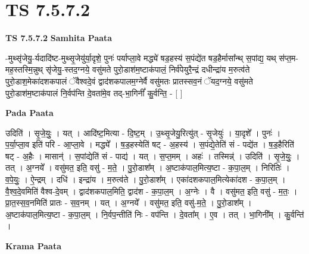 \documentclass[17pt]{extarticle}
\begin{document}
\section{ TS 7.5.7.2 }

\textbf{TS 7.5.7.2 } \newline
\textbf{Samhita Paata} \newline

-मुथ्सृ॑जेयु॒-र्यदादि॑ष्ट-मुथ्सृ॒जेयु॑र्या॒दृशे॒ पुनः॑ पर्याप्ला॒वे मद्ध्ये॑ षड॒हस्य॑ स॒पंद्ये॑त षड॒हैर्मासा᳚न्थ् स॒पांद्य॒ यथ् स॑प्त॒म- मह॒स्तस्मि॒न्नुथ् सृ॑जेयु॒-स्तद॒ग्नये॒ वसु॑मते पुरो॒डाश॑म॒ष्टाक॑पालं॒ निर्व॑पेयुरै॒न्द्रं दधीन्द्रा॑य म॒रुत्व॑ते पुरो॒डाश॒मेका॑दशकपालं ॅवैश्वदे॒वं द्वाद॑शकपालम॒ग्नेर्वै वसु॑मतः प्रातस्सव॒नं ॅयद॒ग्नये॒ वसु॑मते पुरो॒डाश॑म॒ष्टाक॑पालं नि॒र्वप॑न्ति दे॒वता॑मे॒व तद्-भा॒गिनीं᳚ कु॒र्वन्ति॒ - [  ] \newline

\textbf{Pada Paata} \newline

उदिति॑ । सृ॒जे॒युः॒ । यत् । आदि॑ष्ट॒मित्या - दि॒ष्ट॒म् । उ॒थ्सृ॒जेयु॒रित्यु॑त् - सृ॒जेयुः॑ । या॒दृशे᳚ । पुनः॑ । प॒र्या॒प्ला॒व इति॑ परि - आ॒प्ला॒वे । मद्ध्ये᳚ । ष॒ड॒हस्येति॑ षट् - अ॒हस्य॑ । स॒पंद्ये॒तेति॑ सं - पद्ये॑त । ष॒ड॒हैरिति॑ षट् - अ॒हैः । मासान्॑ । स॒पांद्येति॑ सं - पाद्य॑ । यत् । स॒प्त॒मम् । अहः॑ । तस्मिन्न्॑ । उदिति॑ । सृ॒जे॒युः॒ । तत् । अ॒ग्नये᳚ । वसु॑मत॒ इति॒ वसु॑ - म॒ते॒ । पु॒रो॒डाश᳚म् । अ॒ष्टाक॑पाल॒मित्य॒ष्टा - क॒पा॒ल॒म् । निरितिः॑ । व॒पे॒युः॒ । ऐ॒न्द्रम् । दधि॑ । इन्द्रा॑य । म॒रुत्व॑ते । पु॒रो॒डाश᳚म् । एका॑दशकपाल॒मित्येका॑दश - क॒पा॒ल॒म् । वै॒श्व॒दे॒वमिति॑ वैश्व-दे॒वम् । द्वाद॑शकपाल॒मिति॒ द्वाद॑श - क॒पा॒ल॒म् । अ॒ग्नेः । वै । वसु॑मत॒ इति॒ वसु॑ - म॒तः॒ । प्रा॒त॒स्स॒व॒नमिति॑ प्रातः - स॒व॒नम् । यत् । अ॒ग्नये᳚ । वसु॑मत॒ इति॒ वसु॑-म॒ते॒ । पु॒रो॒डाश᳚म् । अ॒ष्टाक॑पाल॒मित्य॒ष्टा - क॒पा॒ल॒म् । नि॒र्वप॒न्तीति॑ निः - वप॑न्ति । दे॒वता᳚म् । ए॒व । तत् । भा॒गिनी᳚म् । कु॒र्वन्ति॑ ।  \newline


\textbf{Krama Paata} \newline
\end{document}
